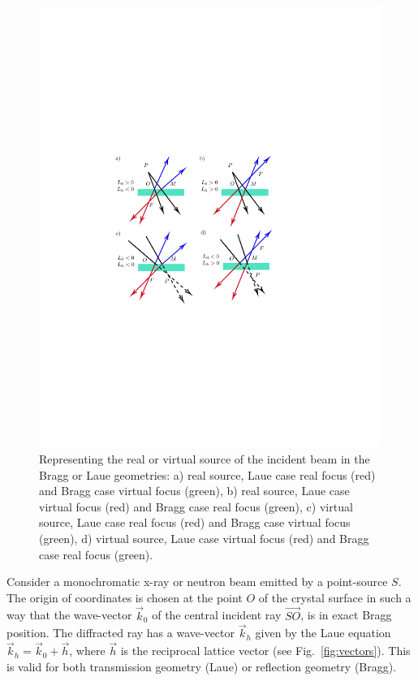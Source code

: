 \documentclass[preprint]{iucr}              %
\newcommand{\inblue}[1]{{\color{black}#1}}
\begin{document}
\begin{figure}
\label{fig:geometries}
\caption{Representing the real or virtual source of the incident beam in the Bragg or Laue geometries:
a) real source, Laue case real focus (red) and Bragg case virtual focus (green),
b) real source, Laue case virtual focus (red) and Bragg case real focus (green),
c) virtual source, Laue case real focus (red) and Bragg case virtual focus (green),  
d) virtual source, Laue case virtual focus (red) and Bragg case real focus (green).
}
\includegraphics[width=0.99\textwidth,trim=4cm 9cm 6cm 9cm,clip=true]{fig1.pdf}
\end{figure}

Consider a monochromatic x-ray or neutron beam emitted by a point-source $S$. The origin of coordinates is chosen at the point $O$ of the crystal surface in such a way that the wave-vector  ${\vec k_0}$ of the \inblue{central} incident ray $\vec{SO}$, is in exact Bragg  position. The diffracted ray has a wave-vector $\vec k_h$ given by the Laue equation $\vec k_h = \vec k_0 + \vec h$, where $\vec h$ is the reciprocal lattice vector (see Fig.~\ref{fig:vectors}). This is valid for both transmission geometry (Laue) or reflection geometry (Bragg). 
\end{document}
